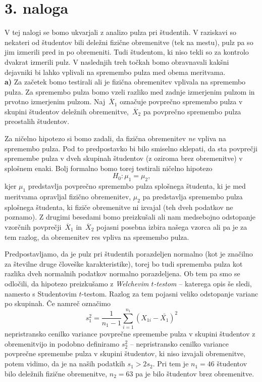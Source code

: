 \documentclass[a4paper,11pt]{article}
\newcommand{\olsi}[1]{\,\overline{\!{#1}}} %
\begin{document}
\section*{3. naloga}

V tej nalogi se bomo ukvarjali z analizo pulza pri študentih. V raziskavi so nekateri od študentov bili deležni fizične obremenitve (tek na mestu), pulz pa so jim izmerili pred in po obremeniti. Tudi študentom, ki niso tekli so za kontrolo dvakrat izmerili pulz. V naslednjih treh točkah bomo obravnavali kakšni dejavniki bi lahko vplivali na spremembo pulza med obema meritvama.
\\

\noindent
\textbf{a)} Za začetek bomo testirali ali je fizična obremenitev vplivala na spremembo pulza. Za spremembo pulza bomo vzeli razliko med zadnje izmerjenim pulzom in prvotno izmerjenim pulzom. Naj $\olsi{X}_1$ označuje povprečno spremembo pulza v skupini študentov deležnih obremenitve, $\olsi{X}_2$ pa povprečno spremembo pulza preostalih študentov. 

Za ničelno hipotezo si bomo zadali, da fizična obremenitev \emph{ne} vpliva na spremembo pulza. Pod to predpostavko bi bilo smiselno sklepati, da sta povprečji spremembe pulza v dveh skupinah študentov (z oziroma brez obremenitve) v splošnem enaki. Bolj formalno bomo torej testirali ničelno hipotezo
\[
    H_0 : \mu_1 = \mu_2,
\]
kjer $\mu_1$ predstavlja povprečno spremembo pulza splošnega študenta, ki je med meritvama opravljal fizično obremenitev, $\mu_2$ pa predstavlja spremembo pulza splošnega študenta, ki fiziče obremenitve ni izvajal (teh dveh podatkov ne poznamo). Z drugimi besedami bomo preizkušali ali nam medsebojno odstopanje vzorčnih povprečji $\olsi{X}_1$ in $\olsi{X}_2$ pojasni posebna izbira našega vzorca ali pa je za tem razlog, da obremenitev res vpliva na spremembo pulza. 

Predpostavljamo, da je pulz pri študentih porazdeljen normalno (kot je značilno za številne druge človeške karakteristike), torej bo tudi sprememba pulza kot razlika dveh normalnih podatkov normalno porazdeljena. Ob tem pa smo se odločili, da hipotezo preizkušamo z \emph{Welchevim $t$-testom} -- katerega opis še sledi, namesto s Studentovim $t$-testom. 
Razlog za tem pojasni veliko odstopanje varianc po skupinah. Če namreč označimo
\[
    s_1^2 = \frac{1}{n_1 - 1}\sum_{i = 1}^{n_1} (X_{1i} - \bar{X_1})^2
\]
nepristransko cenilko variance povprečne spremembe pulza v skupini študentov z obremenitvijo in podobno definiramo $s_2^2$ -- nepristransko cenilko variance povprečne spremembe pulza v skupini študentov, ki niso izvajali obremenitve, potem vidimo, da je na naših podatkih $s_1 > 2s_2$. Pri tem je $n_1 = 46$ študentov bilo deležnih fizične obremenitve, $n_2 = 63$ pa je bilo študentov brez obremenitve. 
\end{document}
